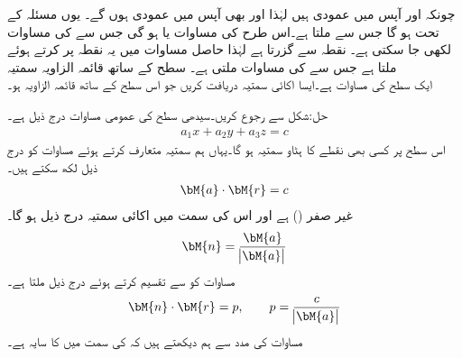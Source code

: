 چونکہ  اور  آپس میں عمودی ہیں لہٰذا  اور  بھی آپس میں عمودی ہوں گے۔ یوں مسئلہ  کے تحت   ہو گا جس سے  ملتا ہے۔اس طرح  کی مساوات  یا  ہو گی جس سے  کی مساوات  لکھی جا سکتی ہے۔  نقطہ  سے گزرتا ہے لہٰذا حاصل مساوات میں یہ نقطہ پر کرتے ہوئے  ملتا ہے جس سے  کی مساوات  ملتی ہے۔
\quad سطح کے ساتھ قائمہ الزاویہ سمتیہ\\
ایک سطح کی مساوات  ہے۔ایسا اکائی سمتیہ دریافت کریں جو اس سطح کے ساتھ قائمہ الزاویہ ہو۔

حل:شکل  سے رجوع کریں۔سیدھی سطح کی عمومی مساوات درج ذیل ہے۔
\begin{align}\label{مساوات_الجبرا_سیدھی_سطح_الف}
a_1x+a_2y+a_3z=c
\end{align} 
اس سطح پر کسی بھی نقطے کا ہٹاو سمتیہ  ہو گا۔یہاں ہم سمتیہ  متعارف کرتے ہوئے  مساوات  کو درج ذیل لکھ سکتے ہیں۔
\begin{align}\label{مساوات_الجبرا_سیدھی_سطح_ب}
\bM{a}\cdot\bM{r}=c
\end{align}
 غیر صفر () ہے اور اس کی سمت میں اکائی سمتیہ  درج ذیل ہو گا۔
\begin{align*}
\bM{n}=\frac{\bM{a}}{\abs{\bM{a}}}
\end{align*}
مساوات  کو  سے تقسیم کرتے ہوئے درج ذیل ملتا ہے۔
\begin{align}
\bM{n}\cdot \bM{r}=p,\quad \quad  p=\frac{c}{\abs{\bM{a}}}
\end{align}
مساوات  کی مدد سے ہم دیکھتے ہیں کہ  کی سمت میں  کا سایہ  ہے۔

